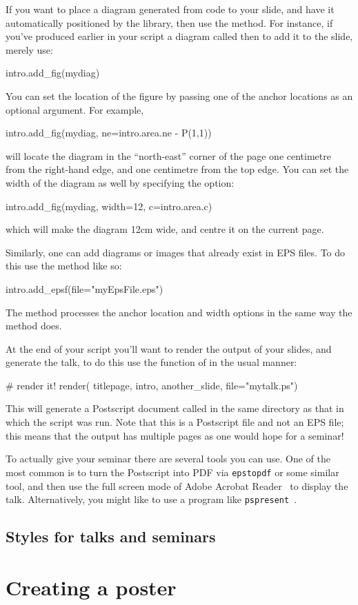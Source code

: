 If you want to place a diagram generated from \pyscript code to your slide,
and have it automatically positioned by the library, then use the
 method.  For instance, if you've produced earlier in your
\pyscript script a diagram called  then to add it to the slide,
merely use:
\begin{python}
intro.add_fig(mydiag)
\end{python}
You can set the location of the figure by passing one of the \pyscript anchor
locations as an optional argument.  For example,
\begin{python}
intro.add_fig(mydiag, ne=intro.area.ne - P(1,1))
\end{python}
will locate the diagram in the ``north-east'' corner of the page one
centimetre from the right-hand edge, and one centimetre from the top edge.
You can set the width of the diagram as well by specifying the 
option:
\begin{python}
intro.add_fig(mydiag, width=12, c=intro.area.c)
\end{python}
which will make the diagram 12cm wide, and centre it on the current page.

Similarly, one can add diagrams or images that already exist in EPS files.
To do this use the  method like so:
\begin{python}
intro.add_epsf(file="myEpsFile.eps")
\end{python}
The  method processes the anchor location and width
options in the same way the  method does.

At the end of your script you'll want to render the output of your slides,
and generate the talk, to do this use the  function of
\pyscript in the usual manner:
\begin{python}
# render it!
render(
    titlepage,
    intro,
    another_slide,
    file="mytalk.ps")
\end{python}
This will generate a Postscript document called  in the same
directory as that in which the \pyscript script was run.  Note that this is
a Postscript file and not an EPS file; this means that the output has
multiple pages as one would hope for a seminar!

To actually give your seminar there are several tools you can use.  One of
the most common is to turn the Postscript into PDF via \texttt{epstopdf} or
some similar tool, and then use the full screen mode of Adobe Acrobat
Reader~\cite{acroread} to display the talk.  Alternatively, you might like to
use a program like \texttt{pspresent}~\cite{pspresent}.

\subsection{Styles for talks and seminars}
\label{sec:styles}

\section{Creating a poster}

